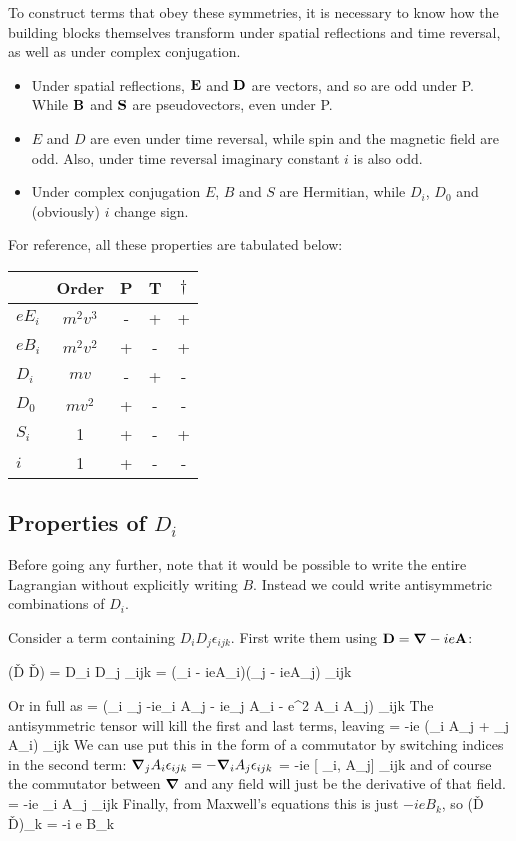 To construct terms that obey these symmetries, it is necessary to know how the building blocks themselves transform under spatial reflections and time reversal, as well as under complex conjugation.
 \begin{itemize}
   \item  Under spatial reflections, $\mathbf{E}$ and $\mathbf{D}$ are vectors, and so are odd under P.  While $\mathbf{B}$  and $\mathbf{S}$ are pseudovectors, even under P.
   \item  $E$ and $D$ are even under time reversal, while spin and the magnetic field are odd.  Also, under time reversal imaginary constant $i$ is also odd.
   \item Under complex conjugation $E$, $B$ and $S$ are Hermitian, while $D_i$, $D_0$ and (obviously) $i$ change sign. 
 \end{itemize}
 
 For reference, all these properties are tabulated below:

 
\begin{tabular}{l|c|ccc}
& Order	&	P	&	T	&	$\dagger$	\\
\hline
$eE_i$	&$m^2v^3$	&	-	& 	+	&	+		\\
$eB_i$	&$m^2v^2$	&	+	&   -	&	+		\\
$D_i$		& $mv$	&	-	&	+	&	-		\\
$D_0$		& $mv^2$	&	+	&	-	&	-		\\
$S_i$		& 1		&	+	&	-	&	+		\\
$i$		& 1		&	+	&	-	&	-		\\
\end{tabular}

\subsection{Properties of $D_i$}
Before going any further, note that it would be possible to write the entire Lagrangian without explicitly writing $B$.  Instead we could write antisymmetric combinations of $D_i$.  

Consider a term containing $D_i D_j \epsilon_{ijk}$.  First write them using $\mathbf{D} = \mbox{\boldmath$ \nabla $} - i e\mathbf{A}$:

\beq
	(\v{D} \times \v{D}) = D_i D_j \epsilon_{ijk} = (\grad_i - ieA_i)(\grad_j - ieA_j) \epsilon_{ijk}
\eeq

Or in full as
\beq
	= (\grad_i \grad_j -ie\grad_i A_j - ie\grad_j A_i - e^2 A_i A_j) \epsilon_{ijk}
\eeq
The antisymmetric tensor will kill the first and last terms, leaving
\beq
	= -ie (\grad_i A_j + \grad_j A_i) \epsilon_{ijk}
\eeq
We can use put this in the form of a commutator by switching indices in the second term: $\mbox{\boldmath$ \nabla $} _j A_i \epsilon_{ijk} = - \mbox{\boldmath$ \nabla $} _i A_j \epsilon_{ijk}$
\beq
	= -ie [ \grad_i, A_j] \epsilon_{ijk}
\eeq
and of course the commutator between $\grad$ and any field will just be the derivative of that field.
\beq
	= -ie \partial_i A_j \epsilon_{ijk}
\eeq
Finally, from Maxwell's equations this is just  $-ie B_k$, so 
\beq
	(\v{D} \times \v{D})_k = -i e B_k
\eeq

